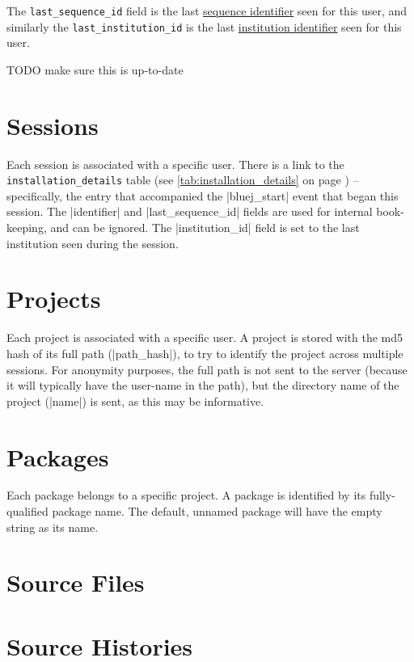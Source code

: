 \documentclass{book}
\newcommand{\myref}[1]{\autoref{#1} on page \pageref*{#1}}
\newcommand{\tabref}[1]{\lstinline|#1| table (see \myref{tab:#1})}
\begin{document}
The \texttt{last\_sequence\_id} field is the last \hyperref[def:sequence_id]{sequence identifier} seen for
this user, and similarly the \texttt{last\_institution\_id} is the last
\hyperref[def:institution_id]{institution identifier} seen for this user.

TODO make sure this is up-to-date

\section{Sessions}


Each session is associated with a specific user.  There is a link to
the \tabref{installation_details} -- specifically, the entry that
accompanied the |bluej_start| event that began this session.  The
|identifier| and |last_sequence_id| fields are used for internal
book-keeping, and can be ignored.  The |institution_id| field is set
to the last institution seen during the session.

\section{Projects}


Each project is associated with a specific user.  A project is stored with the
md5 hash of its full path (|path_hash|), to try to identify the project across multiple
sessions.  For anonymity purposes, the full path is not sent to the server
(because it will typically have the user-name in the path), but the directory
name of the project (|name|) is sent, as this may be informative.

\section{Packages}


Each package belongs to a specific project.  A package is identified by its
fully-qualified package name.  The default, unnamed package will have the
empty string as its name.

\section{Source Files}

\section{Source Histories}
\end{document}
